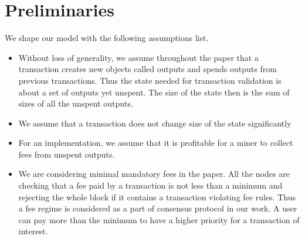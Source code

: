 \documentclass[]{llncs}   %
\begin{document}

\section{Preliminaries}
\label{sec:preliminaries}

We shape our model with the following assumptions list.
\begin{itemize}%
  \item \label{a:utxo} Without loss of generality, we assume throughout the paper that a transaction creates new objects called outputs and spends outputs from previous transactions. Thus the state needed for transaction validation is about a set of outputs yet unspent. The size of the state then is the sum of sizes of all the unspent outputs.  
  \item \label{a:state} We assume that a transaction does not change size of the state significantly
  \item \label{a:miner} For an implementation, we assume that it is profitable for a miner to collect fees from unspent outputs. 
  \item \label{a:minimal} We are considering minimal mandatory fees in the paper. All the nodes
      are checking that a fee paid by a transaction is not less than a minimum
      and rejecting the whole block if it contains a transaction violating fee
      rules. Thus a fee regime is considered as a part of consensus protocol in
      our work. A user can pay more than the minimum to have a higher priority
      for a transaction of interest.
\end{itemize}
\end{document}
